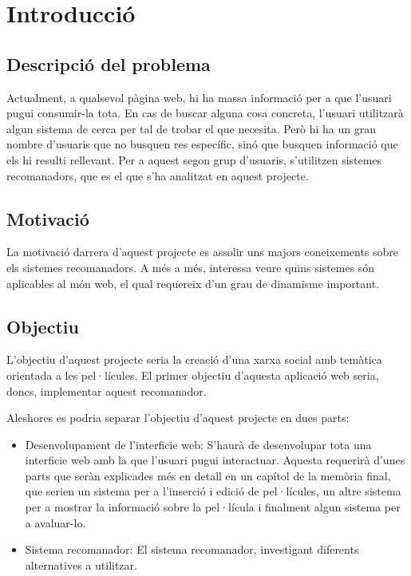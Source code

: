 \chapter{Introducció}
\section{Descripció del problema}

Actualment, a qualsevol pàgina web, hi ha massa informació per a que l'usuari pugui consumir-la tota. En cas de buscar alguna cosa concreta, l'usuari utilitzarà algun sistema de cerca per tal de trobar el que necesita. Però hi ha un gran nombre d'usuaris que no busquen res específic, sinó que busquen informació que els hi resulti rellevant. Per a aquest segon grup d'usuaris, s'utilitzen sistemes recomanadors, que es el que s'ha analitzat en aquest projecte.

\section{Motivació}

La motivació darrera d'aquest projecte es assolir uns majors coneixements sobre els sistemes recomanadors. A més a més, interessa veure quins sistemes són aplicables al món web, el qual requereix d'un grau de dinamisme important.

\section{Objectiu}

L'objectiu d'aquest projecte seria la creació d'una xarxa social amb temàtica orientada a les pel·lícules. El primer objectiu d'aquesta aplicació web seria, doncs, implementar aquest recomanador.

Aleshores es podria separar l'objectiu d'aquest projecte en dues parts:

\begin{itemize}
\item Desenvolupament de l'interficie web: S'haurà de desenvolupar tota una interficie web amb la que l'usuari pugui interactuar. Aquesta requerirà d'unes parts que seràn explicades més en detall en un capítol de la memòria final, que serien un sistema per a l'inserció i edició de pel·lícules, un altre sistema per a mostrar la informació sobre la pel·lícula i finalment algun sistema per a avaluar-lo.
\item Sistema recomanador: El sistema recomanador, investigant diferents alternatives a utilitzar.
\end{itemize}

